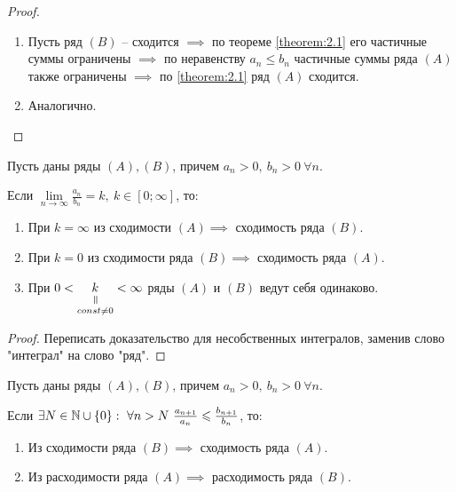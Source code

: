 \begin{proof}\leavevmode
    \begin{enumerate}
        \item Пусть ряд $(B)$ -- сходится $\implies$ по теореме \ref{theorem:2.1} его частичные суммы ограничены $\implies$ по неравенству $a_n\leqslant b_n$ частичные суммы ряда $(A)$ также ограничены $\implies$ по \ref{theorem:2.1} ряд $(A)$ сходится.
        \item Аналогично.
    \end{enumerate}
\end{proof}

\begin{theorem}
    Пусть даны ряды $ (A),(B) $, причем $a_n > 0, \ b_n > 0 \ \forall n$.

    Если $\underset{n\rightarrow\infty}{\lim}\frac{a_n}{b_n}=k, \ k\in [0;\infty]$, то:
    \begin{enumerate}
        \item При $k=\infty$ из сходимости $(A) \implies$ сходимость ряда $(B)$.
        \item При $k=0$ из сходимости ряда $(B) \implies$ сходимость ряда $(A)$.
        \item При $0<\equalto{k}{const \ne 0}<\infty$ ряды $(A)$ и $(B)$ ведут себя одинаково.
    \end{enumerate}
\end{theorem}

\begin{proof}
    Переписать доказательство для несобственных интегралов, заменив слово "интеграл" на слово "ряд".
\end{proof}

\begin{theorem}
    Пусть даны ряды $ (A),(B) $, причем $a_n > 0, \ b_n > 0 \ \forall n$.

    Если $\exists N \in \N \cup \{0\}: \ \forall n > N \ \frac{a_{n+1}}{a_n}\leqslant\frac{b_{n+1}}{b_n} $, то:
    \begin{enumerate}
        \item Из сходимости ряда $(B) \implies$ сходимость ряда $(A)$.
        \item Из расходимости ряда $(A) \implies$ расходимость ряда $(B)$.
    \end{enumerate}
\end{theorem}

